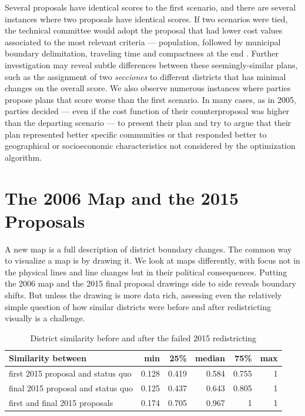 \documentclass[letter,12pt]{article}
\begin{document}
Several proposals have identical scores to the first scenario, and there are several instances where two proposals have identical scores. If two scenarios were tied, the technical committee would adopt the proposal that had lower cost values associated to the most relevant criteria --- population, followed by municipal boundary delimitation, traveling time and compactness at the end \citep{acuerdoife2013}. Further investigation may reveal subtle differences between these seemingly-similar plans, such as the assignment of two \emph{secciones} to different districts that has minimal changes on the overall score. We also observe numerous instances where parties propose plans that score worse than the first scenario. In many cases, as in 2005, parties decided --- even if the cost function of their counterproposal was higher than the departing scenario --- to present their plan and try to argue that their plan represented better specific communities or that responded better to geographical or socioeconomic characteristics not considered by the optimization algorithm.

\section{The 2006 Map and the 2015 Proposals}

A new map is a full description of district boundary changes. The common way to visualize a map is by drawing it. We look at maps differently, with focus not in the physical lines and line changes but in their political consequences. Putting the 2006 map and the 2015 final proposal drawings side to side reveals boundary shifts. But unless the drawing is more data rich, assessing even the relatively simple question of how similar districts were before and after redistricting visually is a challenge. 

\begin{table}
\begin{center}
  \begin{tabular}{lrrrrr}
  Similarity between                 &   min  &  25\%  & median &  75\% &  max \\ \hline
  first 2015 proposal and status quo & 0.128  & 0.419  & 0.584  & 0.755 &  1   \\
  final 2015 proposal and status quo & 0.125  & 0.437  & 0.643  & 0.805 &  1   \\
  first and final 2015 proposals     & 0.174  & 0.705  & 0.967  & 1     &  1   \\
  \end{tabular}
  \caption{District similarity before and after the failed 2015 redistricting}\label{T:simIndex}
\end{center}
\end{table}
\end{document}
